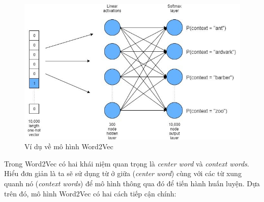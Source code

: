 \documentclass[12pt,a4paper,oneside]{book}
\begin{document}
	\begin{figure}[H]
		\begin{center}
			\includegraphics[width=0.7\columnwidth]{w2v_ex}
		\end{center}
		\caption{Ví dụ về mô hình Word2Vec}
	\end{figure}
	
	Trong Word2Vec có hai khái niệm quan trọng là \textit{center word} và \textit{context words}.
	Hiểu đơn giản là ta sẽ sử dụng từ ở giữa (\textit{center word}) cùng với các từ xung quanh nó (\textit{context words}) để mô hình thông qua đó để tiến hành huấn luyện. Dựa trên đó, mô hình Word2Vec có hai cách tiếp cận chính:
	
\end{document}
